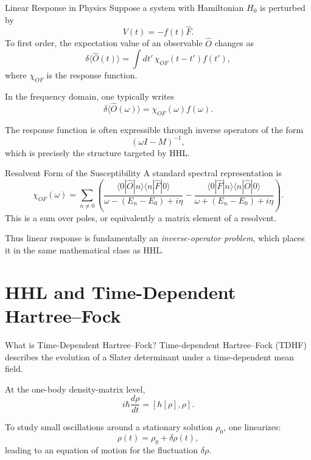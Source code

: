 \documentclass{beamer}
\begin{document}
\begin{frame}{Linear Response in Physics}
  Suppose a system with Hamiltonian \(H_0\) is perturbed by
  \[
  V(t) = - f(t)\hat{F}.
  \]
  To first order, the expectation value of an observable \(\hat{O}\) changes as
  \[
  \delta \langle \hat{O}(t) \rangle
  =
  \int dt' \, \chi_{OF}(t-t') f(t'),
  \]
  where \(\chi_{OF}\) is the response function.

  In the frequency domain, one typically writes
  \[
  \delta \langle \hat{O}(\omega)\rangle
  =
  \chi_{OF}(\omega) f(\omega).
  \]

  The response function is often expressible through inverse operators of the form
  \[
  (\omega I - M)^{-1},
  \]
  which is precisely the structure targeted by HHL.
\end{frame}


\begin{frame}{Resolvent Form of the Susceptibility}
  A standard spectral representation is
  \[
  \chi_{OF}(\omega)
  =
  \sum_{n\neq 0}
  \left(
  \frac{\langle 0|\hat{O}|n\rangle \langle n|\hat{F}|0\rangle}
       {\omega-(E_n-E_0)+i\eta}
       -
       \frac{\langle 0|\hat{F}|n\rangle \langle n|\hat{O}|0\rangle}
            {\omega+(E_n-E_0)+i\eta}
            \right).
            \]
            This is a sum over poles, or equivalently a matrix element of a resolvent.

            Thus linear response is fundamentally an \emph{inverse-operator problem}, which places it in the same mathematical class as HHL.
\end{frame}

\section{HHL and Time-Dependent Hartree--Fock}

\begin{frame}{What is Time-Dependent Hartree--Fock?}
  Time-dependent Hartree--Fock (TDHF) describes the evolution of a Slater determinant under a time-dependent mean field.

  At the one-body density-matrix level,
  \[
  i\hbar \frac{d\rho}{dt} = [h[\rho],\rho].
  \]

  To study small oscillations around a stationary solution \(\rho_0\), one linearizes:
  \[
  \rho(t) = \rho_0 + \delta\rho(t),
  \]
  leading to an equation of motion for the fluctuation \(\delta\rho\).
\end{frame}
\end{document}
